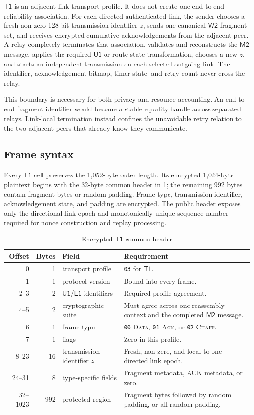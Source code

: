 \documentclass[11pt,oneside]{article}
\newcommand{\Uone}{\ensuremath{\mathsf{U1}}}
\newcommand{\Eone}{\ensuremath{\mathsf{E1}}}
\newcommand{\Mtwo}{\ensuremath{\mathsf{M2}}}
\newcommand{\Wtwo}{\ensuremath{\mathsf{W2}}}
\newcommand{\Tone}{\ensuremath{\mathsf{T1}}}
\newcommand{\code}[1]{\texttt{#1}}
\begin{document}
\Tone{} is an adjacent-link transport profile. It does not create one end-to-end reliability association. For each directed authenticated link, the sender chooses a fresh non-zero 128-bit transmission identifier $z$, sends one canonical \Wtwo{} fragment set, and receives encrypted cumulative acknowledgements from the adjacent peer. A relay completely terminates that association, validates and reconstructs the \Mtwo{} message, applies the required \Uone{} or route-state transformation, chooses a new $z$, and starts an independent transmission on each selected outgoing link. The identifier, acknowledgement bitmap, timer state, and retry count never cross the relay.

This boundary is necessary for both privacy and resource accounting. An end-to-end fragment identifier would become a stable equality handle across separated relays. Link-local termination instead confines the unavoidable retry relation to the two adjacent peers that already know they communicate.

\subsection{Frame syntax}

Every \Tone{} cell preserves the 1,052-byte outer length. Its encrypted 1,024-byte plaintext begins with the 32-byte common header in \cref{tab:t1header}; the remaining 992 bytes contain fragment bytes or random padding. Frame type, transmission identifier, acknowledgement state, and padding are encrypted. The public header exposes only the directional link epoch and monotonically unique sequence number required for nonce construction and replay processing.

\begin{table}[ht]
\centering
\caption{Encrypted \Tone{} common header}
\label{tab:t1header}
\begin{tabularx}{\textwidth}{@{}r r p{} X@{}}
\toprule
Offset & Bytes & Field & Requirement \\
\midrule
0 & 1 & transport profile & \code{03} for \Tone{}. \\
1 & 1 & protocol version & Bound into every frame. \\
2--3 & 2 & \Uone{}/\Eone{} identifiers & Required profile agreement. \\
4--5 & 2 & cryptographic suite & Must agree across one reassembly context and the completed \Mtwo{} message. \\
6 & 1 & frame type & \code{00} \textsc{Data}, \code{01} \textsc{Ack}, or \code{02} \textsc{Chaff}. \\
7 & 1 & flags & Zero in this profile. \\
8--23 & 16 & transmission identifier $z$ & Fresh, non-zero, and local to one directed link epoch. \\
24--31 & 8 & type-specific fields & Fragment metadata, ACK metadata, or zero. \\
32--1023 & 992 & protected region & Fragment bytes followed by random padding, or all random padding. \\
\bottomrule
\end{tabularx}
\end{table}
\end{document}
